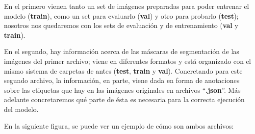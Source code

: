 En el primero vienen tanto un set de imágenes preparadas para poder entrenar el modelo (\textbf{train}), como un set para evaluarlo (\textbf{val}) y otro para probarlo (\textbf{test}); nosotros nos quedaremos con los sets de evaluación y de entrenamiento (\textbf{val} y \textbf{train}).

En el segundo, hay información acerca de las máscaras de segmentación de las imágenes del primer archivo; viene en diferentes formatos y está organizado con el mismo sistema de carpetas de antes (\textbf{test}, \textbf{train} y \textbf{val}). Concretando para este segundo archivo, la información, en parte, viene dada en forma de anotaciones sobre las etiquetas que hay en las imágenes originales en archivos ``\textbf{.json}''. Más adelante concretaremos qué parte de ésta es necesaria para la correcta ejecución del modelo.

En la siguiente figura, se puede ver un ejemplo de cómo son ambos archivos:

